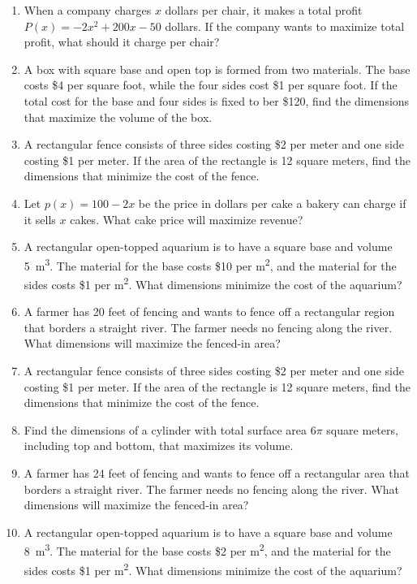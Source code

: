 \documentclass[10pt]{scrartcl}
\theoremstyle{definition}
\begin{document}
\begin{enumerate}
\item [2018 Fall Final] When a company charges $x$ dollars per chair, it makes a total profit $P(x) = -2x^2 + 200x - 50$ dollars. If the company wants to maximize total profit, what should it charge per chair?
\item [2017 Fall Exam 3] A box with square base and open top is formed from two materials. The base costs \$4 per square foot, while the four sides cost \$1 per square foot. If the total cost for the base and four sides is fixed to ber \$120, find the dimensions that maximize the volume of the box.
\item [2017 Fall Final] A rectangular fence consists of three sides costing \$2 per meter and one side costing \$1 per meter. If the area of the rectangle is 12 square meters, find the dimensions that minimize the cost of the fence.
\item [2017 Spring Exam 3] Let $p(x) = 100 - 2x$ be the price in dollars per cake a bakery can charge if it sells $x$ cakes. What cake price will maximize revenue?
\item [2017 Spring Exam 3] A rectangular open-topped aquarium is to have a square base and volume \SI{5}{m^3}. The material for the base costs \$10 per \si{m^2}, and the material for the sides costs \$1 per \si{m^2}. What dimensions minimize the cost of the aquarium?
\item [2017 Spring Final] A farmer has 20 feet of fencing and wants to fence off a rectangular region that borders a straight river. The farmer needs no fencing along the river. What dimensions will maximize the fenced-in area?
\item [2016 Fall Exam 3] A rectangular fence consists of three sides costing \$2 per meter and one side costing \$1 per meter. If the area of the rectangle is 12 square meters, find the dimensions that minimize the cost of the fence.
\item [2016 Fall Final] Find the dimensions of a cylinder with total surface area $6\pi$ square meters, including top and bottom, that maximizes its volume.
\item [2016 Spring Exam 3] A farmer has 24 feet of fencing and wants to fence off a rectangular area that borders a straight river. The farmer needs no fencing along the river. What dimensions will maximize the fenced-in area?
\item [2016 Spring Exam 3] A rectangular open-topped aquarium is to have a square base and volume \SI{8}{m^3}. The material for the base costs \$2 per \si{m^2}, and the material for the sides costs \$1 per \si{m^2}. What dimensions minimize the cost of the aquarium?

\end{enumerate}
\end{document}
